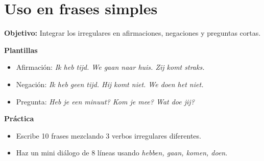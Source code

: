 \section{Uso en frases simples}
\textbf{Objetivo:} Integrar los irregulares en afirmaciones, negaciones y preguntas cortas.

\textbf{Plantillas}
\begin{itemize}[leftmargin=*]
  \item Afirmación: \textit{Ik heb tijd. We gaan naar huis. Zij komt straks.}
  \item Negación: \textit{Ik heb geen tijd. Hij komt niet. We doen het niet.}
  \item Pregunta: \textit{Heb je een minuut? Kom je mee? Wat doe jij?}
\end{itemize}

\textbf{Práctica}
\begin{itemize}[leftmargin=*]
  \item Escribe 10 frases mezclando 3 verbos irregulares diferentes.
  \item Haz un mini diálogo de 8 líneas usando \textit{hebben, gaan, komen, doen}.
\end{itemize}
